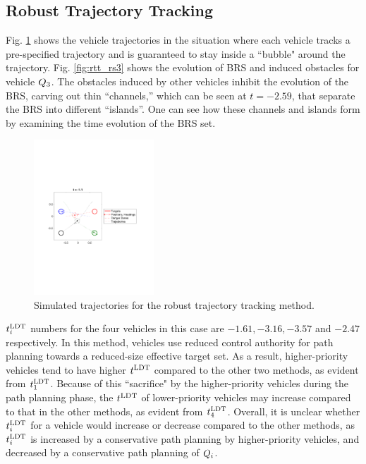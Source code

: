 \subsection{Robust Trajectory Tracking}
Fig. \ref{fig:rtt_traj} shows the vehicle trajectories in the situation where each vehicle tracks a pre-specified trajectory and is guaranteed to stay inside a ``bubble" around the trajectory. Fig. \ref{fig:rtt_rs3} shows the evolution of BRS and induced obstacles for vehicle $Q_3$. The obstacles induced by other vehicles inhibit the evolution of the BRS, carving out thin “channels,” which can be seen at $t = -2.59$, that separate the BRS into different “islands”. One can see how these channels and islands form by examining the time evolution of the BRS set.

\begin{figure}
  \centering
  \includegraphics[width=0.40\textwidth]{"fig/rtt_traj"}
  \caption{Simulated trajectories for the robust trajectory tracking method.}
  \label{fig:rtt_traj}
  \vspace{-2em}
\end{figure}

$t^\text{LDT}_i$ numbers for the four vehicles in this case are $-1.61, -3.16, -3.57$ and $-2.47$ respectively. In this method, vehicles use reduced control authority for path planning towards a reduced-size effective target set. As a result, higher-priority vehicles tend to have higher $t^\text{LDT}$ compared to the other two methods, as evident from $t^\text{LDT}_1$. Because of this ``sacrifice" by the higher-priority vehicles during the path planning phase, the $t^\text{LDT}$ of lower-priority vehicles may increase compared to that in the other methods, as evident from $t^\text{LDT}_4$. Overall, it is unclear whether $t^\text{LDT}_i$ for a vehicle would increase or decrease compared to the other methods, as $t^\text{LDT}_i$ is increased by a conservative path planning by higher-priority vehicles, and decreased by a conservative path planning of $Q_i$. 

